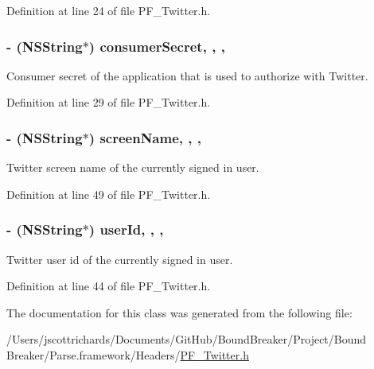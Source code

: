 Definition at line 24 of file P\+F\+\_\+\+Twitter.\+h.

\hypertarget{interface_p_f___twitter_a5cd32ce792aa0047289c40ef24495d87}{}
\subsubsection[{consumer\+Secret}]{\setlength{\rightskip}{0pt plus 5cm}-\/ (N\+S\+String$\ast$) consumer\+Secret\hspace{0.3cm}{\ttfamily [read]}, {\ttfamily [write]}, {\ttfamily [nonatomic]}, {\ttfamily [copy]}}\label{interface_p_f___twitter_a5cd32ce792aa0047289c40ef24495d87}
Consumer secret of the application that is used to authorize with Twitter. 

Definition at line 29 of file P\+F\+\_\+\+Twitter.\+h.

\hypertarget{interface_p_f___twitter_abd234e6e32ffb958ff2e9a7176c28e63}{}
\subsubsection[{screen\+Name}]{\setlength{\rightskip}{0pt plus 5cm}-\/ (N\+S\+String$\ast$) screen\+Name\hspace{0.3cm}{\ttfamily [read]}, {\ttfamily [write]}, {\ttfamily [nonatomic]}, {\ttfamily [copy]}}\label{interface_p_f___twitter_abd234e6e32ffb958ff2e9a7176c28e63}
Twitter screen name of the currently signed in user. 

Definition at line 49 of file P\+F\+\_\+\+Twitter.\+h.

\hypertarget{interface_p_f___twitter_a323160d0fafcc787ae3e7f705697e284}{}
\subsubsection[{user\+Id}]{\setlength{\rightskip}{0pt plus 5cm}-\/ (N\+S\+String$\ast$) user\+Id\hspace{0.3cm}{\ttfamily [read]}, {\ttfamily [write]}, {\ttfamily [nonatomic]}, {\ttfamily [copy]}}\label{interface_p_f___twitter_a323160d0fafcc787ae3e7f705697e284}
Twitter user id of the currently signed in user. 

Definition at line 44 of file P\+F\+\_\+\+Twitter.\+h.



The documentation for this class was generated from the following file\+:\begin{DoxyCompactItemize}
\item 
/\+Users/jscottrichards/\+Documents/\+Git\+Hub/\+Bound\+Breaker/\+Project/\+Bound Breaker/\+Parse.\+framework/\+Headers/\hyperlink{_p_f___twitter_8h}{P\+F\+\_\+\+Twitter.\+h}\end{DoxyCompactItemize}
